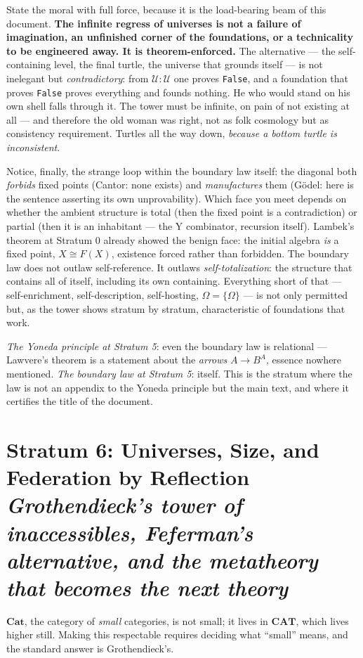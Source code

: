 \documentclass[11pt]{article}
\theoremstyle{plain}
\theoremstyle{definition}
\theoremstyle{remark}
\newcommand{\Cat}{\mathbf{Cat}}
\newcommand{\CAT}{\mathbf{CAT}}
\newcommand{\U}{\mathcal{U}}
\newcommand{\stratum}[2]{\section{#1 \\ {\normalsize\normalfont\itshape #2}}}
\begin{document}
State the moral with full force, because it is the load-bearing beam of this document. \textbf{The infinite regress of universes is not a failure of imagination, an unfinished corner of the foundations, or a technicality to be engineered away. It is theorem-enforced.} The alternative --- the self-containing level, the final turtle, the universe that grounds itself --- is not inelegant but \emph{contradictory}: from $\U : \U$ one proves \texttt{False}, and a foundation that proves \texttt{False} proves everything and founds nothing. He who would stand on his own shell falls through it. The tower must be infinite, on pain of not existing at all --- and therefore the old woman was right, not as folk cosmology but as consistency requirement. Turtles all the way down, \emph{because a bottom turtle is inconsistent}.

Notice, finally, the strange loop within the boundary law itself: the diagonal both \emph{forbids} fixed points (Cantor: none exists) and \emph{manufactures} them (G\"odel: here is the sentence asserting its own unprovability). Which face you meet depends on whether the ambient structure is total (then the fixed point is a contradiction) or partial (then it is an inhabitant --- the Y combinator, recursion itself). Lambek's theorem at Stratum 0 already showed the benign face: the initial algebra \emph{is} a fixed point, $X \cong F(X)$, existence forced rather than forbidden. The boundary law does not outlaw self-reference. It outlaws \emph{self-totalization}: the structure that contains all of itself, including its own containing. Everything short of that --- self-enrichment, self-description, self-hosting, $\Omega = \{\Omega\}$ --- is not only permitted but, as the tower shows stratum by stratum, characteristic of foundations that work.

\begin{refrain}
\emph{The Yoneda principle at Stratum 5}: even the boundary law is relational --- Lawvere's theorem is a statement about the \emph{arrows} $A \to B^A$, essence nowhere mentioned. \emph{The boundary law at Stratum 5}: itself. This is the stratum where the law is not an appendix to the Yoneda principle but the main text, and where it certifies the title of the document.
\end{refrain}

\stratum{Stratum 6: Universes, Size, and Federation by Reflection}{Grothendieck's tower of inaccessibles, Feferman's alternative, and the metatheory that becomes the next theory}

$\Cat$, the category of \emph{small} categories, is not small; it lives in $\CAT$, which lives higher still. Making this respectable requires deciding what ``small'' means, and the standard answer is Grothendieck's.
\end{document}

